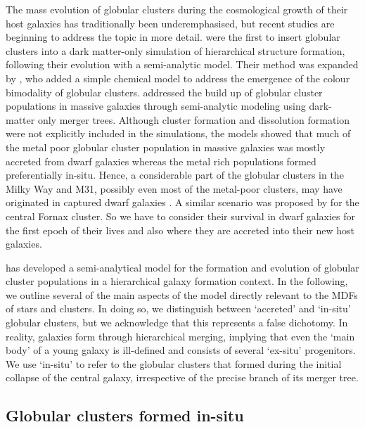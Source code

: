 \documentclass{aa}
\begin{document}
The mass evolution of globular clusters during the cosmological growth of their host galaxies has traditionally been underemphasised, but recent studies are beginning to address the topic in more detail. \citet{prieto08} were the first to insert globular clusters into a dark matter-only simulation of hierarchical structure formation, following their evolution with a semi-analytic model. Their method was expanded by \citet{muratov10}, who added a simple chemical model to address the emergence of the colour bimodality of globular clusters.  \citet{tonini13} addressed the build up of globular cluster populations in massive galaxies through semi-analytic modeling using dark-matter only merger trees.  Although cluster formation and dissolution formation were not explicitly included in the simulations, the models showed that much of the metal poor globular cluster population in massive galaxies was mostly accreted from dwarf galaxies whereas the metal rich populations formed preferentially in-situ.  Hence, a considerable part of the globular clusters in the Milky Way and M31, possibly even most of the metal-poor clusters, may have originated in captured dwarf galaxies \citep{cote98,marin-franch09,lee07,mackey10,mackey13}. 
A similar scenario was proposed by \citet{hilker99} for the central Fornax cluster. 
So we have to consider their survival in dwarf galaxies for the first epoch of their lives and also where they are accreted into their new host galaxies.

\citet{kruijssen15b} has developed a semi-analytical model for the formation and evolution of globular cluster populations in a hierarchical galaxy formation context. In the following, we outline several of the main aspects of the model directly relevant to the MDFs of stars and clusters. In doing so, we distinguish between `accreted' and `in-situ' globular clusters, but we acknowledge that this represents a false dichotomy. In reality, galaxies form through hierarchical merging, implying that even the `main body' of a young galaxy is ill-defined and consists of several `ex-situ' progenitors. We use `in-situ' to refer to the globular clusters that formed during the initial collapse of the central galaxy, irrespective of the precise branch of its merger tree.

\subsection{Globular clusters formed in-situ} \label{sec:cosmology:insitu}
\end{document}
